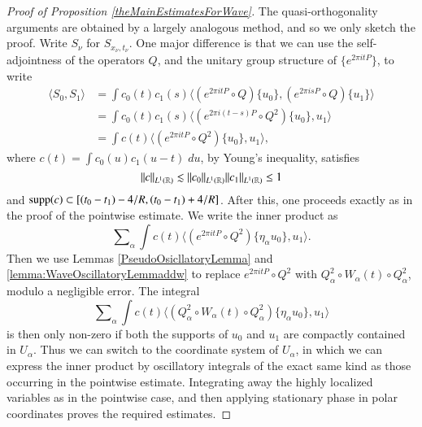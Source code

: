 \begin{proof}[Proof of Proposition \ref{theMainEstimatesForWave}]
The quasi-orthogonality arguments are obtained by a largely analogous method, and so we only sketch the proof. Write $S\!_\nu$ for $S\!_{x_\nu,t_\nu}$. One major difference is that we can use the self-adjointness of the operators $Q$, and the unitary group structure of $\{ e^{2 \pi i t P} \}$, to write
%
\begin{equation}
\begin{split}
    \langle S\!_0, S\!_1 \rangle &= \int c_0(t) c_1(s) \big\langle (e^{2 \pi i t P} \circ Q) \{ u_0 \}, (e^{2 \pi i s P} \circ Q) \{ u_1 \} \big\rangle\\
    &= \int c_0(t) c_1(s) \big\langle (e^{2 \pi i (t - s) P} \circ Q^2) \{ u_0 \}, u_1 \big\rangle\\
    &= \int c(t) \big\langle (e^{2 \pi i t P} \circ Q^2) \{ u_0 \}, u_1 \big\rangle,
\end{split}
\end{equation}
%
where $c(t) = \int c_0(u) c_1(u - t)\; du$, by Young's inequality, satisfies
%
\begin{equation}
    \| c \|_{L^1(\operatorname{\mathbb{R}})} \lesssim \| c_0 \|_{L^1(\operatorname{\mathbb{R}})} \| c_1 \|_{L^1(\operatorname{\mathbb{R}})} \leq 1
\end{equation}
%
and $\operatorname{\text{supp}}(c) \subset [ (t_0 - t_1) - 4/R, (t_0 - t_1) + 4/R]$. After this, one proceeds exactly as in the proof of the pointwise estimate. We write the inner product as
%
\begin{equation}
    \sum\nolimits_\alpha \int c(t) \big\langle (e^{2 \pi i t P} \circ Q^2) \{ \eta_\alpha u_0 \}, u_1 \big\rangle.
\end{equation}
%
Then we use Lemmas \ref{PseudoOsicllatoryLemma} and \ref{lemma:WaveOscillatoryLemmaddw} to replace $e^{2 \pi i tP} \circ Q^2$ with $Q_{\alpha}^2 \circ W_{\alpha}(t) \circ Q_{\alpha}^2$, modulo a negligible error. The integral
%
\begin{equation}
    \sum\nolimits_\alpha \int c(t) \big\langle (Q_{\alpha}^2 \circ W_{\alpha}(t) \circ Q_{\alpha}^2) \{ \eta_\alpha u_0 \}, u_1 \big\rangle
\end{equation}
%
is then only non-zero if both the supports of $u_0$ and $u_1$ are compactly contained in $U_\alpha$. Thus we can switch to the coordinate system of $U_\alpha$, in which we can express the inner product by oscillatory integrals of the exact same kind as those occurring in the pointwise estimate. Integrating away the highly localized variables as in the pointwise case, and then applying stationary phase in polar coordinates proves the required estimates.
\end{proof}

